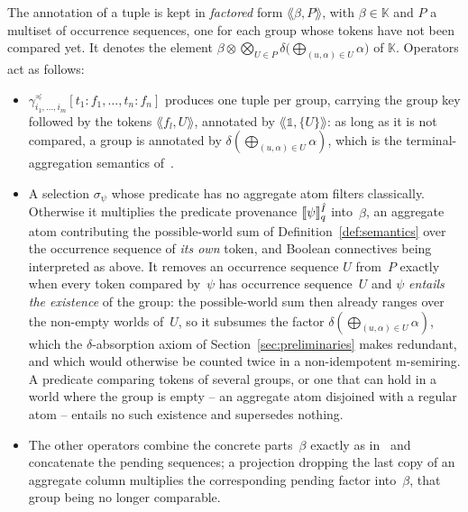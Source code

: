 \begin{toappendix}
\begin{definition}
The annotation of a tuple is kept in \emph{factored} form
$\lAngle\beta,P\rAngle$, with $\beta\in\mathbb K$
and $P$ a multiset of occurrence sequences, one for each group whose
tokens have not been compared yet. It denotes the element
\(
  \beta\otimes\bigotimes_{U\in P}
    \delta\bigl(\bigoplus_{(u,\alpha)\in U}\alpha\bigr)
\)
of $\mathbb K$. Operators act as follows:
\begin{itemize}
\item $\gamma^{\preceq}_{i_1,\dots,i_m}[t_1{:}f_1,\dots,t_n{:}f_n]$
  produces one tuple per group, carrying the group key followed by the
  tokens $\lAngle f_l,U\rAngle$, annotated by $\lAngle\mathbb 1,\{U\}\rAngle$:
  as long as it is not compared, a group is annotated by
  $\delta(\bigoplus_{(u,\alpha)\in U}\alpha)$, which is the terminal-aggregation
  semantics of~\cite{sen2026provsql}.
\item A selection $\sigma_\psi$ whose predicate has no aggregate atom
  filters classically. Otherwise it multiplies the predicate provenance
  $\llbracket \psi\rrbracket^{\hat I}_{q}$ into~$\beta$, an aggregate atom
  contributing the possible-world sum of Definition~\ref{def:semantics}
  over the occurrence sequence of \emph{its own} token, and Boolean
  connectives being
  interpreted as above. It removes an
  occurrence sequence $U$ from~$P$ exactly when every token compared
  by~$\psi$ has occurrence sequence~$U$ and $\psi$ \emph{entails the
  existence} of the group: the
  possible-world sum then already ranges over the non-empty worlds
  of~$U$, so it subsumes the factor $\delta(\bigoplus_{(u,\alpha)\in
  U}\alpha)$, which the $\delta$-absorption axiom of Section~\ref{sec:preliminaries}
  makes redundant, and which would otherwise be counted twice in a
  non-idempotent m-semiring. A predicate comparing tokens of several
  groups, or one that can hold in a world where the group is empty --
  an aggregate atom disjoined with a regular atom -- entails no such
  existence and supersedes nothing.
\item The other operators combine the concrete parts~$\beta$ exactly as
  in~\cite{sen2026provsql} and concatenate the pending sequences; a
  projection dropping the last copy of an aggregate column multiplies the
  corresponding pending factor into~$\beta$, that group being no longer
  comparable.
\end{itemize}
\end{definition}


\end{toappendix}
